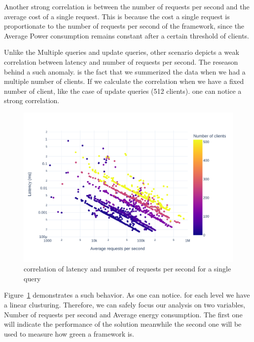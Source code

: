 Another strong correlation is between the number of requests per second and the average cost of a single request. This is because the cost a single request is proportionate to the number of requests per second of the framework, since the Average Power consumption remains constant after a certain threshold of clients.

Unlike the Multiple queries and update queries, other scenario depicts a weak correlation between latency and number of requests per second. The reseason behind a such anomaly. is the fact that we summerized the data when we had a multiple number of clients. If we calculate the correlation when we have a fixed number of client, like the case of update queries (512 clients). one can notice a strong correlation.
\begin{figure}[bht]
    \centering
    \includegraphics[width=.8\columnwidth ]{imgs/scatter_db_latency_rps}
    \caption{correlation of latency and number of requests per second for a single query}
    \label{fig:scatter_db}
\end{figure}
Figure~\ref{fig:scatter_db} demonstrates a such behavior. As one can notice. for each level we have a linear clusturing.
Therefore, we can safely focus our analysis on two variables, Number of requests per second and Average energy consumption. The first one will indicate the performance of the solution meanwhile the second one will be used to measure how green a framework is.





